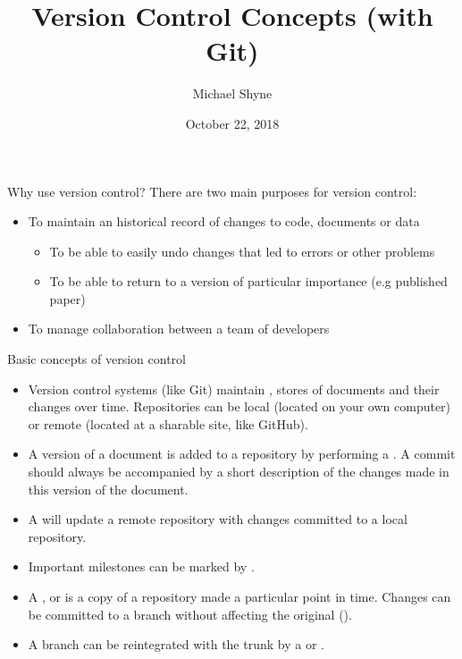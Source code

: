 \documentclass[11pt,xcolor=dvipsnames, aspectratio=169]{beamer}
\title[Short title]{Version Control Concepts (with Git)}
\author[M. Shyne]{\Large Michael Shyne}
\institute[Short Inst]{Biostatistical Design and Analysis Center\\University of Minnesota}
\date{October 22, 2018}
\begin{document}
\frame{\titlepage}

\begin{frame}{Why use version control?}
There are two main purposes for version control:
\begin{itemize}
\item To maintain an historical record of changes to code, documents or data
\begin{itemize}
\item To be able to easily undo changes that led to errors or other problems
\item To be able to return to a version of particular importance (e.g published paper)
\end{itemize}

\item To manage collaboration between a team of developers
\end{itemize}
\end{frame}

\begin{frame}{Basic concepts of version control}
\begin{itemize}
\item Version control systems (like Git) maintain , stores of documents and their changes over time. Repositories can be local (located on your own computer) or remote (located at a sharable site, like GitHub).

\item A version of a document is added to a repository by performing a . A commit should always be accompanied by a short description of the changes made in this version of the document.

\item A  will update a remote repository with changes committed to a local repository.

\item Important milestones can be marked by .

\item A , or  is a copy of a repository made a particular point in time. Changes can be committed to a branch without affecting the original ().

\item A branch can be reintegrated with the trunk by a  or .
\end{itemize}
\end{frame}
\end{document}
